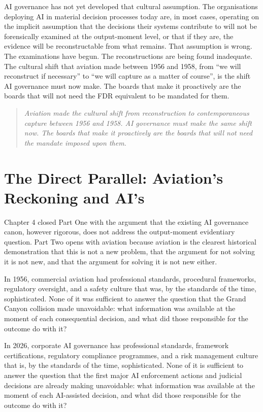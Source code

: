AI governance has not yet developed that cultural assumption. The organisations deploying AI in material decision processes today are, in most cases, operating on the implicit assumption that the decisions their systems contribute to will not be forensically examined at the output-moment level, or that if they are, the evidence will be reconstructable from what remains. That assumption is wrong. The examinations have begun. The reconstructions are being found inadequate. The cultural shift that aviation made between 1956 and 1958, from ``we will reconstruct if necessary'' to ``we will capture as a matter of course'', is the shift AI governance must now make. The boards that make it proactively are the boards that will not need the FDR equivalent to be mandated for them.

\begin{quote}
\emph{Aviation made the cultural shift from reconstruction to contemporaneous capture between 1956 and 1958. AI governance must make the same shift now. The boards that make it proactively are the boards that will not need the mandate imposed upon them.}
\end{quote}

\scenebreak

\section{The Direct Parallel: Aviation's Reckoning and AI's}

Chapter 4 closed Part One with the argument that the existing AI governance canon, however rigorous, does not address the output-moment evidentiary question. Part Two opens with aviation because aviation is the clearest historical demonstration that this is not a new problem, that the argument for not solving it is not new, and that the argument for solving it is not new either.

In 1956, commercial aviation had professional standards, procedural frameworks, regulatory oversight, and a safety culture that was, by the standards of the time, sophisticated. None of it was sufficient to answer the question that the Grand Canyon collision made unavoidable: what information was available at the moment of each consequential decision, and what did those responsible for the outcome do with it?

In 2026, corporate AI governance has professional standards, framework certifications, regulatory compliance programmes, and a risk management culture that is, by the standards of the time, sophisticated. None of it is sufficient to answer the question that the first major AI enforcement actions and judicial decisions are already making unavoidable: what information was available at the moment of each AI-assisted decision, and what did those responsible for the outcome do with it?


